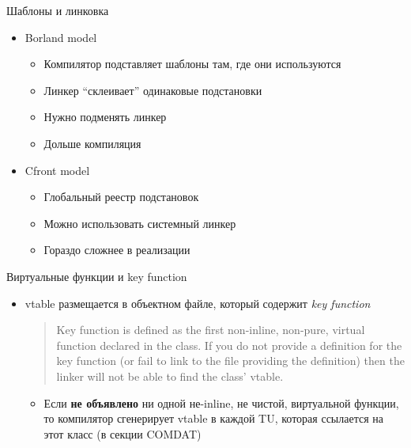 \documentclass{beamer}
\begin{document}
\begin{frame}{Шаблоны и линковка}
    \begin{itemize}
        \item Borland model
            \begin{itemize}
                \item Компилятор подставляет шаблоны там, где они используются
                \item Линкер ``склеивает'' одинаковые подстановки
                \item Нужно подменять линкер
                \item Дольше компиляция
            \end{itemize}
            \pause
        \item Cfront model
            \begin{itemize}
                \item Глобальный реестр подстановок
                \item Можно использовать системный линкер
                \item Гораздо сложнее в реализации
            \end{itemize}
    \end{itemize}
\end{frame}

\begin{frame}{Виртуальные функции и key function}
    \begin{itemize}
        \item vtable размещается в объектном файле, который содержит \emph{key function}
            \begin{quote}
                Key function is defined as the first non-inline, non-pure, virtual function declared
                in the class. If you do not provide a definition for the key function (or fail to
                link to the file providing the definition) then the linker will not be able to find
                the class' vtable.
            \end{quote}
            \begin{itemize}
                \item Если \textbf{не объявлено} ни одной не-inline, не чистой, виртуальной функции,
                    то компилятор сгенерирует vtable в каждой TU, которая ссылается на
                    этот класс (в секции COMDAT)
            \end{itemize}
    \end{itemize}
\end{frame}
\end{document}
